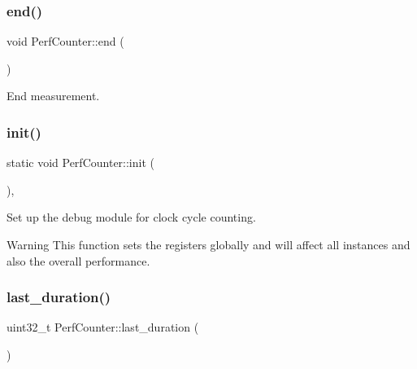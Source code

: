 \subsubsection{\texorpdfstring{end()}{end()}}
{\footnotesize\ttfamily void Perf\+Counter\+::end (\begin{DoxyParamCaption}{ }\end{DoxyParamCaption})\hspace{0.3cm}{\ttfamily [inline]}}



End measurement. 

\mbox{\label{classPerfCounter_ae1897d617e84a28c141d554810fcaee9}} 
\subsubsection{\texorpdfstring{init()}{init()}}
{\footnotesize\ttfamily static void Perf\+Counter\+::init (\begin{DoxyParamCaption}{ }\end{DoxyParamCaption})\hspace{0.3cm}{\ttfamily [inline]}, {\ttfamily [static]}}



Set up the debug module for clock cycle counting. 

\begin{DoxyWarning}{Warning}
This function sets the registers globally and will affect all instances and also the overall performance. 
\end{DoxyWarning}
\mbox{\label{classPerfCounter_a5239f46d98a619e0145f09320052bfc8}} 
\subsubsection{\texorpdfstring{last\+\_\+duration()}{last\_duration()}}
{\footnotesize\ttfamily uint32\+\_\+t Perf\+Counter\+::last\+\_\+duration (\begin{DoxyParamCaption}{ }\end{DoxyParamCaption})\hspace{0.3cm}{\ttfamily [inline]}}



